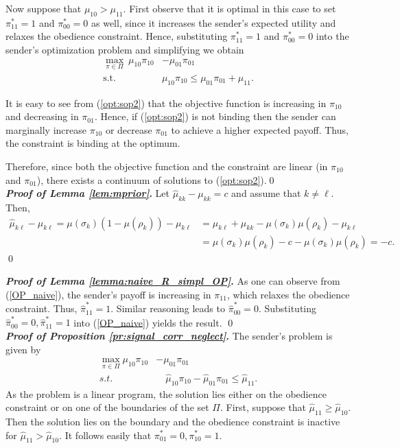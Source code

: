 \documentclass[12pt,english]{article}
\theoremstyle{plain}
\begin{document}
\begin{appendices}
Now suppose that $\mu_{10}>\mu_{11}$. 
First observe that it is optimal in this case to set $\pi^*_{11}=1$ and $\pi^*_{00}=0$ as well, since it increases the sender's expected utility and relaxes the obedience constraint.  
Hence, substituting $\pi^*_{11}=1$ and $\pi^*_{00}=0$ into the sender's optimization problem and simplifying we obtain
\begin{align}
\max_{\pi\in\Pi}\:\mu_{10}\pi_{10}&-\mu_{01}\pi_{01}\label{opt:sop2}\\ 
\text{s.t. } &\mu_{10}\pi_{10}\leq \mu_{01}\pi_{01}+\mu_{11}.\nonumber
\end{align}

\noindent It is easy to see from (\ref{opt:sop2}) that the objective function is increasing in $\pi_{10}$ and decreasing in $\pi_{01}$.
Hence, if (\ref{opt:sop2}) is not binding then the sender can marginally increase $\pi_{10}$ or decrease $\pi_{01}$ to achieve a higher expected payoff. 
Thus, the constraint is binding at the optimum. 

Therefore, since both the objective function and the constraint are linear (in $\pi_{10}$ and $\pi_{01}$), there exists a continuum of solutions to (\ref{opt:sop2}).\qed\\

\noindent\textbf{\emph{Proof of Lemma \ref{lem:mprior}}.}
Let $\hat\mu_{kk}-\mu_{kk}=c$ and assume that $k\neq\ell$. 
Then,  
\begin{align*}
    \hat\mu_{k\ell}-\mu_{k\ell}=\mu(\sigma_k)(1-\mu(\rho_k))-\mu_{k\ell}&=\mu_{k\ell}+\mu_{kk}-\mu(\sigma_k)\mu(\rho_k)-\mu_{k\ell}\\
    &=\mu(\sigma_k)\mu(\rho_k)-c-\mu(\sigma_k)\mu(\rho_k)=-c.
\end{align*}
\qed

\noindent\textbf{\emph{Proof of Lemma \ref{lemma:naive_R_simpl_OP}}.}
As one can observe from (\ref{OP_naive}), the sender's payoff is increasing in $\pi_{11}$, which relaxes the obedience constraint.  Thus, $\hat{\pi}_{11}^* = 1$. Similar reasoning leads to $\hat{\pi}_{00}^* = 0$. Substituting $\hat{\pi}_{00}^{*}=0,\hat{\pi}_{11}^{*}=1$ into (\ref{OP_naive}) yields the result. \qed\\



\noindent\textbf{\emph{Proof of Proposition \ref{pr:signal_corr_neglect}}.}
The sender's problem is given by
\begin{align*}
\max_{\pi\in\Pi} \mu_{10}\pi_{10} & - \mu_{01}\pi_{01}\\
s.t. & \quad\hat{\mu}_{10}\pi_{10}-\hat{\mu}_{01}\pi_{01}\leq\hat{\mu}_{11}.
\end{align*} 
As the problem is a linear program, the solution lies either on the obedience constraint or on one of the boundaries of the set $\Pi$. 
First, suppose that $\hat{\mu}_{11}\geq \hat{\mu}_{10}$.
Then the solution lies on the boundary and the obedience constraint is inactive for $\hat{\mu}_{11} > \hat{\mu}_{10}$.
It follows easily that $\pi_{01}^{*} = 0,\pi_{10}^{*} = 1$. 


\end{appendices}
\end{document}
